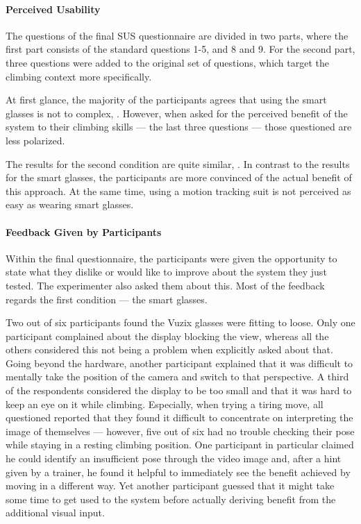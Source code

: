 \paragraph{Perceived Usability}

The questions of the final SUS questionnaire are divided in two parts, where the first part consists of the standard questions \autocite{susgov} 1-5, and 8 and 9. For the second part, three questions were added to the original set of questions, which target the climbing context more specifically.



At first glance, the majority of the participants agrees that using the smart glasses is not to complex, \cf {}. However, when asked for the perceived benefit of the system to their climbing skills --- the last three questions --- those questioned are less polarized. 

The results for the second condition are quite similar, \cf {}. In contrast to the results for the smart glasses, the participants are more convinced of the actual benefit of this approach. At the same time, using a motion tracking suit is not perceived as easy as wearing smart glasses.

\paragraph{Feedback Given by Participants}

Within the final questionnaire, the participants were given the opportunity to state what they dislike or would like to improve about the system they just tested. The experimenter also asked them about this. Most of the feedback regards the first condition --- the smart glasses.

Two out of six participants found the Vuzix glasses were fitting to loose. Only one participant complained about the display blocking the view, whereas all the others considered this not being a problem when explicitly asked about that. Going beyond the hardware, another participant explained that it was difficult to mentally take the position of the camera and switch to that perspective. A third of the respondents considered the display to be too small and that it was hard to keep an eye on it while climbing. Especially, when trying a tiring move, all questioned reported that they found it difficult to concentrate on interpreting the image of themselves --- however, five out of six had no trouble checking their pose while staying in a resting climbing position. One participant in particular claimed he could identify an insufficient pose through the video image and, after a hint given by a trainer, he found it helpful to immediately see the benefit achieved by moving in a different way. Yet another participant guessed that it might take some time to get used to the system before actually deriving benefit from the additional visual input.

